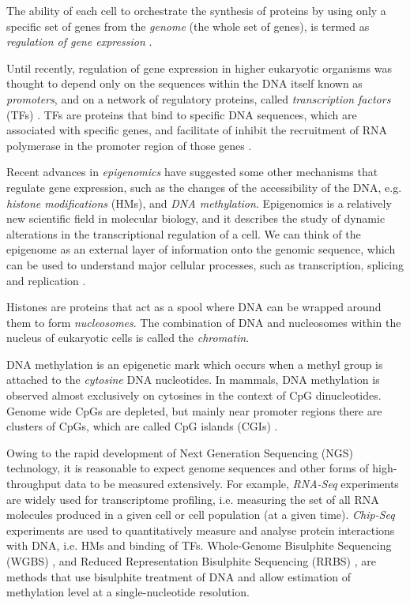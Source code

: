 The ability of each cell to orchestrate the synthesis of proteins by using only a specific set of genes from the \emph{genome} (\ie the whole set of genes), is termed as \emph{regulation of gene expression} \citep{Jasny2001}.

Until recently, regulation of gene expression in higher eukaryotic organisms was thought to depend only on the sequences within the DNA itself known as \emph{promoters}, and on a network of regulatory proteins, called \emph{transcription factors} (TFs) \citep{Jasny2001}. TFs are proteins that bind to specific DNA sequences, which are associated with specific genes, and facilitate of inhibit the recruitment of RNA polymerase in the promoter region of those genes \citep{Ptashne2002}. 

Recent advances in \emph{epigenomics} have suggested some other mechanisms that regulate gene expression, such as the changes of the accessibility of the DNA, e.g. \emph{histone modifications} (HMs), and \emph{DNA methylation}. Epigenomics is a relatively new scientific field in molecular biology, and it describes the study of dynamic alterations in the transcriptional regulation of a cell. We can think of the epigenome as an external layer of information onto the genomic sequence, which can be used to understand major cellular processes, such as transcription, splicing and replication \citep{Furey2012}.

Histones are proteins that act as a spool where DNA can be wrapped around them to form \emph{nucleosomes}. The combination of DNA and nucleosomes within the nucleus of eukaryotic cells is called the \emph{chromatin}. 

DNA methylation is an epigenetic mark which occurs when a methyl group is attached to the \emph{cytosine} DNA nucleotides. In mammals, DNA methylation is observed almost exclusively on cytosines in the context of CpG dinucleotides. Genome wide CpGs are depleted, but mainly near promoter regions there are clusters of CpGs, which are called CpG islands (CGIs) \citep{Bird2002}. 

Owing to the rapid development of Next Generation Sequencing (NGS) technology, it is reasonable to expect genome sequences and other forms of high-throughput data to be measured extensively. For example, \emph{RNA-Seq} experiments \citep{Wang2009} are widely used for transcriptome profiling, i.e. measuring the set of all RNA molecules produced in a given cell or cell population (at a given time). \emph{Chip-Seq} experiments \citep{Park2009} are used to quantitatively measure and analyse protein interactions with DNA, i.e. HMs and binding of TFs. Whole-Genome Bisulphite Sequencing (WGBS) \citep{Frommer1992}, and Reduced Representation Bisulphite Sequencing (RRBS) \citep{Meissner2008}, are methods that use bisulphite treatment of DNA and allow estimation of methylation level at a single-nucleotide resolution. 


